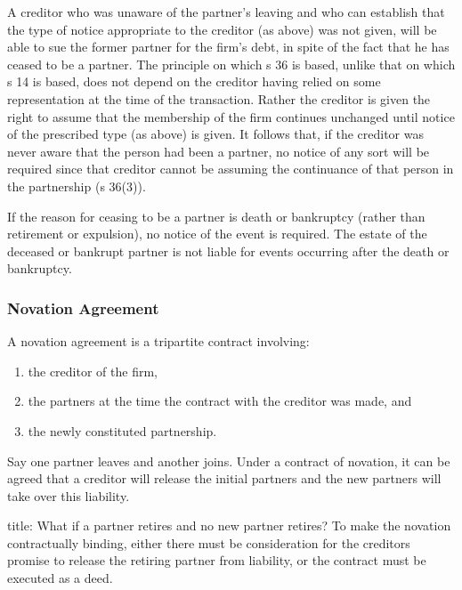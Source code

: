 \documentclass[
]{article}
\newenvironment{Shaded}{}{}
\newcommand{\NormalTok}[1]{#1}
\providecommand{\tightlist}{%
  \setlength{\itemsep}{0pt}\setlength{\parskip}{0pt}}
\begin{document}
A creditor who was unaware of the partner's leaving and who can
establish that the type of notice appropriate to the creditor (as above)
was not given, will be able to sue the former partner for the firm's
debt, in spite of the fact that he has ceased to be a partner. The
principle on which s 36 is based, unlike that on which s 14 is based,
does not depend on the creditor having relied on some representation at
the time of the transaction. Rather the creditor is given the right to
assume that the membership of the firm continues unchanged until notice
of the prescribed type (as above) is given. It follows that, if the
creditor was never aware that the person had been a partner, no notice
of any sort will be required since that creditor cannot be assuming the
continuance of that person in the partnership (s 36(3)).

If the reason for ceasing to be a partner is death or bankruptcy (rather
than retirement or expulsion), no notice of the event is required. The
estate of the deceased or bankrupt partner is not liable for events
occurring after the death or bankruptcy.

\hypertarget{novation-agreement}{%
\subsubsection{Novation Agreement}\label{novation-agreement}}

A novation agreement is a tripartite contract involving:

\begin{enumerate}
\def\labelenumi{\arabic{enumi}.}
\tightlist
\item
  the creditor of the firm,
\item
  the partners at the time the contract with the creditor was made, and
\item
  the newly constituted partnership.
\end{enumerate}

\begin{Shaded}
\begin{Highlighting}[]
\NormalTok{Say one partner leaves and another joins. Under a contract of novation, it can be agreed that a creditor will release the initial partners and the new partners will take over this liability. }
\end{Highlighting}
\end{Shaded}

\begin{Shaded}
\begin{Highlighting}[]
\NormalTok{title: What if a partner retires and no new partner retires?}
\NormalTok{To make the novation contractually binding, either there must be consideration for the creditor\textquotesingle{}s promise to release the retiring partner from liability, or the contract must be executed as a deed. }
\end{Highlighting}
\end{Shaded}
\end{document}

